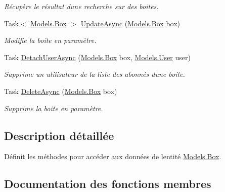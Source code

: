 \begin{DoxyCompactItemize}
\begin{DoxyCompactList}\small\item\em Récupère le résultat d\textquotesingle{}une recherche sur des boites. \end{DoxyCompactList}\item 
Task$<$ \hyperlink{class_boxes_1_1_models_1_1_box}{Models.\+Box} $>$ \hyperlink{interface_boxes_1_1_services_1_1_box_1_1_i_box_service_ae96c252d960cb8f981c766350e950472}{Update\+Async} (\hyperlink{class_boxes_1_1_models_1_1_box}{Models.\+Box} box)
\begin{DoxyCompactList}\small\item\em Modifie la boite en paramètre. \end{DoxyCompactList}\item 
Task \hyperlink{interface_boxes_1_1_services_1_1_box_1_1_i_box_service_a280988e4102350d8c6b452a29f0d45dc}{Detach\+User\+Async} (\hyperlink{class_boxes_1_1_models_1_1_box}{Models.\+Box} box, \hyperlink{class_boxes_1_1_models_1_1_user}{Models.\+User} user)
\begin{DoxyCompactList}\small\item\em Supprime un utilisateur de la liste des abonnés d\textquotesingle{}une boite. \end{DoxyCompactList}\item 
Task \hyperlink{interface_boxes_1_1_services_1_1_box_1_1_i_box_service_a9389dc7e0db5c6042a5c60bf20874a3c}{Delete\+Async} (\hyperlink{class_boxes_1_1_models_1_1_box}{Models.\+Box} box)
\begin{DoxyCompactList}\small\item\em Supprime la boite en paramètre. \end{DoxyCompactList}\end{DoxyCompactItemize}


\subsection{Description détaillée}
Définit les méthodes pour accéder aux données de l\textquotesingle{}entité \hyperlink{class_boxes_1_1_models_1_1_box}{Models.\+Box}. 



\subsection{Documentation des fonctions membres}
